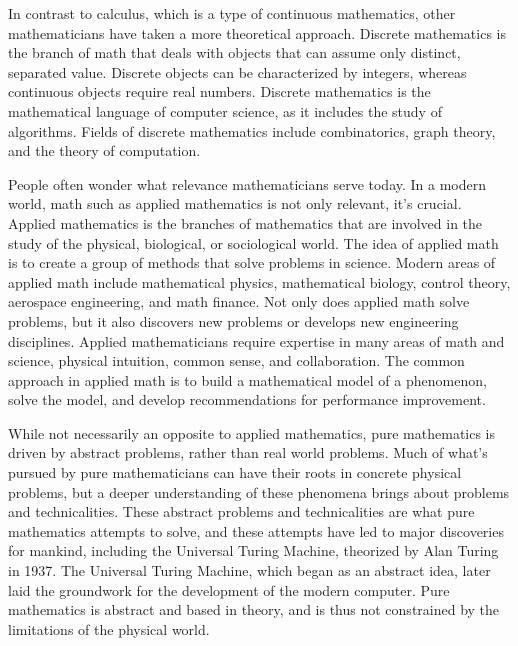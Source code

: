 \documentclass{article}
\begin{document}
In contrast to calculus, which is a type of continuous mathematics, other mathematicians have taken a more theoretical approach. Discrete mathematics is the branch of math that deals with objects that can assume only distinct, separated value. Discrete objects can be characterized by integers, whereas continuous objects require real numbers. Discrete mathematics is the mathematical language of computer science, as it includes the study of algorithms. Fields of discrete mathematics include combinatorics, graph theory, and the theory of computation.\newline \newline

People often wonder what relevance mathematicians serve today. In a modern world, math such as applied mathematics is not only relevant, it's crucial. Applied mathematics is the branches of mathematics that are involved in the study of the physical, biological, or sociological world. The idea of applied math is to create a group of methods that solve problems in science. Modern areas of applied math include mathematical physics, mathematical biology, control theory, aerospace engineering, and math finance. Not only does applied math solve problems, but it also discovers new problems or develops new engineering disciplines. Applied mathematicians require expertise in many areas of math and science, physical intuition, common sense, and collaboration. The common approach in applied math is to build a mathematical model of a phenomenon, solve the model, and develop recommendations for performance improvement.\newline \newline

While not necessarily an opposite to applied mathematics, pure mathematics is driven by abstract problems, rather than real world problems. Much of what's pursued by pure mathematicians can have their roots in concrete physical problems, but a deeper understanding of these phenomena brings about problems and technicalities. These abstract problems and technicalities are what pure mathematics attempts to solve, and these attempts have led to major discoveries for mankind, including the Universal Turing Machine, theorized by Alan Turing in 1937. The Universal Turing Machine, which began as an abstract idea, later laid the groundwork for the development of the modern computer. Pure mathematics is abstract and based in theory, and is thus not constrained by the limitations of the physical world.\newline \newline
\end{document}
